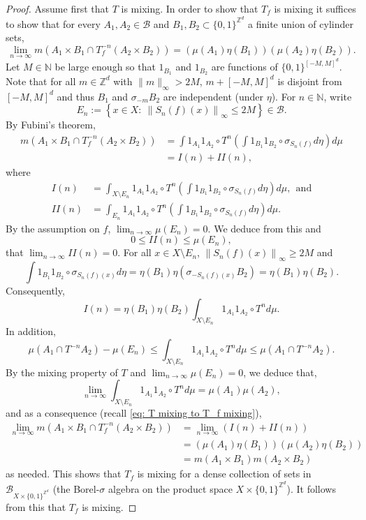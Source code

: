 \documentclass[10pt,a4paper]{amsart}
\newcommand{\B}{\mathcal{B}}
\newcommand{\N}{\mathbb{N}}
\newcommand{\Z}{\mathbb{Z}}
\begin{document}
\begin{proof}
Assume first that $T$ is mixing. In order to show that $T_f$ is mixing it suffices to show that for every $A_1,A_2\in\B$ and $B_1,B_2\subset \{0,1\}^{\Z^d}$ a finite union of cylinder sets,
\[
\lim_{n\to\infty}m\left(A_1\times B_1\cap T_f^{-n}\left(A_2\times B_2\right)\right)=\left(\mu\left(A_1\right)\eta\left(B_1\right)\right)\left(\mu\left(A_2\right)\eta\left(B_2\right)\right). 
\]
Let $M\in\N$ be large enough so that $1_{B_1}$ and $1_{B_2}$ are functions of $\{0,1\}^{[-M,M]^d}$.  Note that for all $m\in\Z^d$ with $\|m\|_\infty>2M$, $m+[-M,M]^d$ is disjoint from $[-M,M]^d$ and thus $B_1$ and $\sigma_{-m}B_2$ are independent (under $\eta$). For $n\in\N$, write 
\[
E_n:=\left\{x\in X:\ \left\|S_n(f)(x)\right\|_\infty\leq 2M\right\}\in\B. 
\]
By Fubini's theorem,
\begin{align*}
m\left(A_1\times B_1\cap T_f^{-n}\left(A_2\times B_2\right)\right)&=\int 1_{A_1}1_{A_2}\circ T^n\left(\int 1_{B_1}1_{B_2}\circ \sigma_{S_n(f)}d\eta\right)d\mu\\
&=I(n)+II(n),
\end{align*}
where 
\begin{align*}
I(n)&= \int_{X\setminus E_n} 1_{A_1}1_{A_2}\circ T^n\left(\int 1_{B_1}1_{B_2}\circ \sigma_{S_n(f)}d\eta\right)d\mu,\ \  \text{and}\\
II(n)&= \int_{E_n} 1_{A_1}1_{A_2}\circ T^n\left(\int 1_{B_1}1_{B_2}\circ \sigma_{S_n(f)}d\eta\right)d\mu.
\end{align*}
By the assumption on $f$, $\lim_{n\to \infty}\mu\left(E_n\right)=0$. We deduce from this and
\[
0\leq II(n)\leq \mu\left(E_n\right),
\]
that $\lim_{n\to\infty}II(n)=0$. For all $x\in X\setminus{E_n}$, $\left\|S_n(f)(x)\right\|_\infty\geq 2M$ and
\[
\int 1_{B_1}1_{B_2}\circ \sigma_{S_n(f)(x)}d\eta=\eta\left(B_1\right)\eta\left(\sigma_{-S_n(f)(x)}B_2\right)=\eta\left(B_1\right)\eta\left(B_2\right). 
\]
Consequently, 
\begin{equation}\label{eq: T mixing to T_f mixing}
I(n)= \eta\left(B_1\right)\eta\left(B_2\right)\int_{X\setminus E_n} 1_{A_1}1_{A_2}\circ T^n d\mu. 
\end{equation}
In addition, 
\[
\mu\left(A_1\cap T^{-n}A_2\right)-\mu\left(E_n\right)\leq \int_{X\setminus E_n} 1_{A_1}1_{A_2}\circ T^n d\mu\leq \mu\left(A_1\cap T^{-n}A_2\right). 
\]
By the mixing property of $T$ and $\lim_{n\to\infty}\mu\left(E_n\right)=0$, we deduce that,
\[
\lim_{n\to \infty}\int_{X\setminus E_n} 1_{A_1}1_{A_2}\circ T^n d\mu=\mu\left(A_1\right)\mu\left(A_2\right),
\]
and as a consequence (recall \eqref{eq: T mixing to T_f mixing}),
\begin{align*}
\lim_{n\to\infty}m\left(A_1\times B_1\cap T_f^{-n}\left(A_2\times B_2\right)\right)&=\lim_{n\to\infty}\left(I(n)+II(n)\right) \\
&=\left(\mu\left(A_1\right)\eta\left(B_1\right)\right)\left(\mu\left(A_2\right)\eta\left(B_2\right)\right)\\
&=m\left(A_1\times B_1\right) m\left(A_2\times B_2\right)
\end{align*} as needed. This shows that $T_f$ is mixing for a dense collection of sets in $\B_{X\times\{0,1\}^{\Z^d}}$ (the Borel-$\sigma$ algebra on the product space $X\times\{0,1\}^{\Z^d}$). It follows from this that $T_f$ is mixing.


\end{proof}
\end{document}
